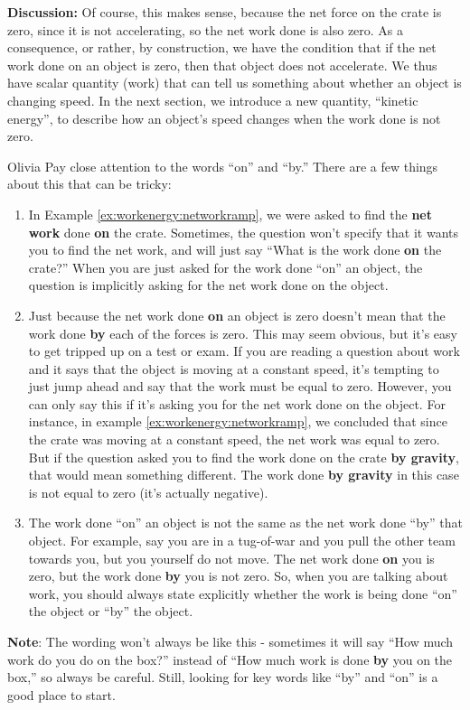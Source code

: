 \begin{example}
\textbf{Discussion:} Of course, this makes sense, because the net force on the crate is zero, since it is not accelerating, so the net work done is also zero. As a consequence, or rather, by construction, we have the condition that if the net work done on an object is zero, then that object does not accelerate. We thus have scalar quantity (work) that can tell us something about whether an object is changing speed. In the next section, we introduce a new quantity, ``kinetic energy'', to describe how an object's speed changes when the work done is not zero.
\end{example}

\newpage
\begin{studentOpinion}{Olivia} Pay close attention to the words ``on'' and ``by.'' There are a few things about this that can be tricky:
\begin{enumerate}
\item In Example \ref{ex:workenergy:networkramp}, we were asked to find the \textbf{net work} done \textbf{on} the crate. Sometimes, the question won't specify that it wants you to find the net work, and will just say ``What is the work done \textbf{on} the crate?'' When you are just asked for the work done ``on'' an object, the question is implicitly asking for the net work done on the object. \\

\item Just because the net work done \textbf{on} an object is zero doesn't mean that the work done \textbf{by} each of the forces is zero. This may seem obvious, but it's easy to get tripped up on a test or exam. If you are reading a question about work and it says that the object is moving at a constant speed, it's tempting to just jump ahead and say that the work must be equal to zero. However, you can only say this if it's asking you for the net work done on the object. For instance, in example \ref{ex:workenergy:networkramp}, we concluded that since the crate was moving at a constant speed, the net work was equal to zero. But if the question asked you to find the work done on the crate \textbf{by gravity}, that would mean something different. The work done \textbf{by gravity} in this case is not equal to zero (it's actually negative). \\

\item The work done ``on'' an object is not the same as the net work done ``by'' that object. For example, say you are in a tug-of-war and you pull the other team towards you, but you yourself do not move. The net work done \textbf{on} you is zero, but the work done \textbf{by} you is not zero. So, when you are talking about work, you should always state explicitly whether the work is being done ``on'' the object or ``by'' the object. 
\end{enumerate}
\textbf{Note}: The wording won't always be like this - sometimes it will say ``How much work do you do on the box?'' instead of ``How much work is done \textbf{by} you on the box,'' so always be careful. Still, looking for key words like ``by'' and ``on'' is a good place to start. 
\end{studentOpinion}

